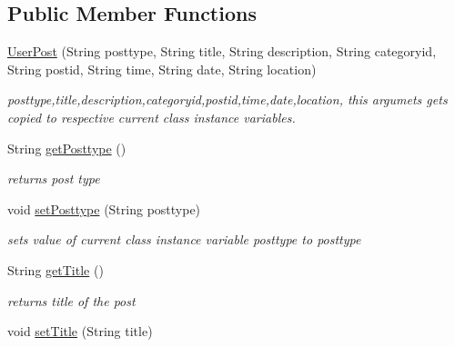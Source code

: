 \subsection*{\-Public \-Member \-Functions}
\begin{DoxyCompactItemize}
\item 
\hyperlink{classcom_1_1example_1_1sel_1_1lostfound_1_1UserPost_a44293053969c4f6a829ea18cdcc8da15}{\-User\-Post} (\-String posttype, \-String title, \-String description, \-String categoryid, \-String postid, \-String time, \-String date, \-String location)
\begin{DoxyCompactList}\small\item\em posttype,title,description,categoryid,postid,time,date,location, this argumets gets copied to respective current class instance variables. \end{DoxyCompactList}\item 
\hypertarget{classcom_1_1example_1_1sel_1_1lostfound_1_1UserPost_a65ec69de0023c60737a2c4ee195c6f67}{\-String \hyperlink{classcom_1_1example_1_1sel_1_1lostfound_1_1UserPost_a65ec69de0023c60737a2c4ee195c6f67}{get\-Posttype} ()}\label{classcom_1_1example_1_1sel_1_1lostfound_1_1UserPost_a65ec69de0023c60737a2c4ee195c6f67}

\begin{DoxyCompactList}\small\item\em returns post type \end{DoxyCompactList}\item 
\hypertarget{classcom_1_1example_1_1sel_1_1lostfound_1_1UserPost_affed3b2cd85fcaed14e84f1fa1742fc3}{void \hyperlink{classcom_1_1example_1_1sel_1_1lostfound_1_1UserPost_affed3b2cd85fcaed14e84f1fa1742fc3}{set\-Posttype} (\-String posttype)}\label{classcom_1_1example_1_1sel_1_1lostfound_1_1UserPost_affed3b2cd85fcaed14e84f1fa1742fc3}

\begin{DoxyCompactList}\small\item\em sets value of current class instance variable posttype to posttype \end{DoxyCompactList}\item 
\hypertarget{classcom_1_1example_1_1sel_1_1lostfound_1_1UserPost_ae28343c4689b498bd501f9de21f37334}{\-String \hyperlink{classcom_1_1example_1_1sel_1_1lostfound_1_1UserPost_ae28343c4689b498bd501f9de21f37334}{get\-Title} ()}\label{classcom_1_1example_1_1sel_1_1lostfound_1_1UserPost_ae28343c4689b498bd501f9de21f37334}

\begin{DoxyCompactList}\small\item\em returns title of the post \end{DoxyCompactList}\item 
\hypertarget{classcom_1_1example_1_1sel_1_1lostfound_1_1UserPost_ae6a0063912a761049b6fd38656600c84}{void \hyperlink{classcom_1_1example_1_1sel_1_1lostfound_1_1UserPost_ae6a0063912a761049b6fd38656600c84}{set\-Title} (\-String title)}\label{classcom_1_1example_1_1sel_1_1lostfound_1_1UserPost_ae6a0063912a761049b6fd38656600c84}


\end{DoxyCompactItemize}
